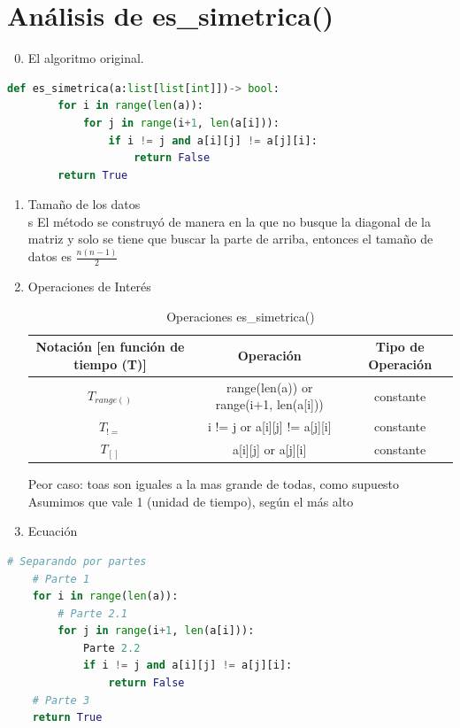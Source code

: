 \documentclass[stu, 12pt, letterpaper, donotrepeattitle, floatsintext, natbib, helv]{apa7}
\begin{document}
\section{Análisis de es\_simetrica()}
\begin{enumerate}
    \setcounter{enumi}{-1}
    \item El algoritmo original.
\end{enumerate}
\begin{lstlisting}[language=Python]
    def es_simetrica(a:list[list[int]])-> bool:
        for i in range(len(a)):
            for j in range(i+1, len(a[i])):
                if i != j and a[i][j] != a[j][i]:
                    return False
        return True
\end{lstlisting}
\begin{enumerate}
    \setcounter{enumi}{0}
    \item Tamaño de los datos \\s
El método se construyó de manera en la que no busque la diagonal de la matriz y solo se tiene que buscar la parte de arriba, entonces el tamaño de datos es $\frac{n(n-1)}{2}$
    \item Operaciones de Interés \\
    \begin{table}[h]
        \centering
        \begin{tabular}{|c c c|} 
         \hline
         Notación [en función de tiempo (T)] & Operación & Tipo de Operación \\ [0.5ex] 
         \hline\hline
         $T_{range()}$ & range(len(a)) or range(i+1, len(a[i])) & constante \\ 
         \hline
         $T_{!=}$ & i != j or a[i][j] != a[j][i] & constante \\
         \hline
         $T_{[]}$ & a[i][j] or a[j][i] & constante \\ [1ex]
         \hline
        \end{tabular}
        \caption{Operaciones es\_simetrica()}
        \label{tab:tablesimetrica}
    \end{table}
        Peor caso: toas son iguales a la mas grande de todas, como supuesto \\
        Asumimos que vale 1 (unidad de tiempo), según el más alto
    \item Ecuación
    \end{enumerate}
\begin{lstlisting}[language=Python]
    # Separando por partes
    # Parte 1
    for i in range(len(a)):
        # Parte 2.1
        for j in range(i+1, len(a[i])):
            Parte 2.2
            if i != j and a[i][j] != a[j][i]:
                return False
    # Parte 3
    return True
\end{lstlisting}
\end{document}
